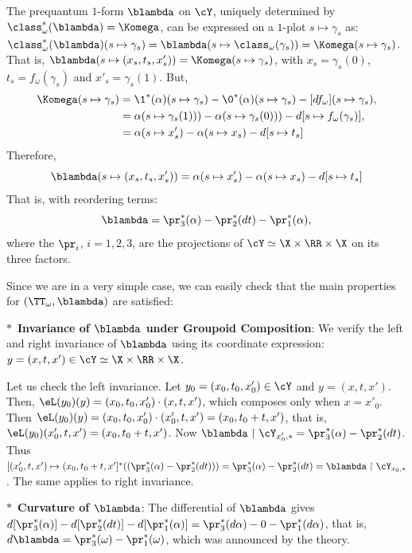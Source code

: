 \begin{article}
    The prequantum $1$-form $\blambda$ on $\cY$,
    uniquely determined by $\class_\omega^*(\blambda) = \Komega$,
    can be expressed on a $1$-plot $s \mapsto \gamma_s$ as:
    $\class_\omega^*(\blambda)(s \mapsto \gamma_s) = \blambda(s \mapsto \class_\omega(\gamma_s))  = \Komega(s \mapsto \gamma_s)$.
    That is,
    $\blambda(s \mapsto (x_s, t_s, x'_s))  = \Komega(s \mapsto \gamma_s)$,
    with $x_s = \gamma_s(0)$,
    $t_s = f_\omega(\gamma_s)$ and $x'_s = \gamma_s(1)$.
    But,
    \begin{align*}
      \Komega(s \mapsto \gamma_s)&  = \1^*(\alpha)(s \mapsto \gamma_s) - \0^*(\alpha)(s \mapsto \gamma_s) - [df_\omega](s \mapsto \gamma_s), \\
      & = \alpha(s \mapsto \gamma_s(1))) - \alpha(s \mapsto \gamma_s(0))) - d[s \mapsto f_\omega(\gamma_s)],\\
      & = \alpha(s \mapsto x'_s) - \alpha(s \mapsto x_s) - d[s \mapsto t_s]
    \end{align*}
    Therefore,
    $$
      \blambda(s \mapsto (x_s, t_s, x'_s)) = \alpha(s \mapsto x'_s) - \alpha(s \mapsto x_s) - d[s \mapsto t_s]
      $$
    That is,
    with reordering terms:
    $$
      \blambda = \pr_3^*(\alpha) - \pr_2^*(dt) - \pr_1^*(\alpha),
      $$
    where the $\pr_i$,
    $i = 1,2,3$,
    are the projections of $\cY \simeq \X \times \RR \times \X$ on its three factors.
    
    Since we are in a very simple case,
    we can easily check that the main properties for $(\TT_\omega, \blambda)$ are satisfied:
    
    $\ast$~\textbf{Invariance of $\blambda$ under Groupoid Composition}:
    We verify the left and right invariance of $\blambda$ using its coordinate expression:
    $y = (x, t, x') \in \cY \simeq \X \times \RR \times \X$.
    
    Let us check the left invariance.
    Let $y_0 = (x_0, t_0, x'_0) \in \cY$ and $y = (x,t,x')$.
    Then,
    $\eL(y_0)(y) = (x_0, t_0, x'_0) \cdot (x,t,x')$,
    which composes only when $x = x'_0$.
    Then $\eL(y_0)(y) = (x_0, t_0, x'_0) \cdot (x'_0,t,x') = (x_0,t_0 + t, x')$,
    that is,
    $\eL(y_0)(x'_0,t,x')= (x_0, t_0 + t, x')$.
    Now
    $\blambda \restriction {\cY_{x'_0,\ast}} = \pr_3^*(\alpha) - \pr_2^*(dt)$.
    Thus $[(x'_0,t,x') \mapsto (x_0,t_0 + t, x']^*((\pr_3^*(\alpha) - \pr_2^*(dt))) = \pr_3^*(\alpha) - \pr_2^*(dt) = \blambda \restriction {\cY_{x_0,\ast}}$.
    The same applies to right invariance.
    
    $\ast$~\textbf{Curvature of $\blambda$}:
    The differential of $\blambda$ gives $d[\pr_3^*(\alpha)] - d[\pr_2^*(dt)] - d[\pr_1^*(\alpha)] = \pr_3^*(d\alpha) - 0 - \pr_1^*(d\alpha)$,
    that is,
    $d\blambda = \pr_3^*(\omega) - \pr_1^*(\omega)$,
    which was announced by the theory.
    

\end{article}
